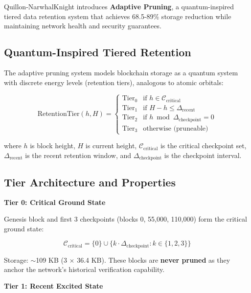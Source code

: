 \documentclass[11pt,a4paper]{article}
\begin{document}
Quillon-NarwhalKnight introduces \textbf{Adaptive Pruning}, a quantum-inspired tiered data retention system that achieves 68.5-89\% storage reduction while maintaining network health and security guarantees.

\subsection{Quantum-Inspired Tiered Retention}

The adaptive pruning system models blockchain storage as a quantum system with discrete energy levels (retention tiers), analogous to atomic orbitals:

\begin{equation}
\text{RetentionTier}(h, H) = \begin{cases}
\text{Tier}_0 & \text{if } h \in \mathcal{C}_{\text{critical}} \\
\text{Tier}_1 & \text{if } H - h \leq \Delta_{\text{recent}} \\
\text{Tier}_2 & \text{if } h \bmod \Delta_{\text{checkpoint}} = 0 \\
\text{Tier}_3 & \text{otherwise (pruneable)}
\end{cases}
\end{equation}

where $h$ is block height, $H$ is current height, $\mathcal{C}_{\text{critical}}$ is the critical checkpoint set, $\Delta_{\text{recent}}$ is the recent retention window, and $\Delta_{\text{checkpoint}}$ is the checkpoint interval.

\subsection{Tier Architecture and Properties}

\textbf{Tier 0: Critical Ground State}

Genesis block and first 3 checkpoints (blocks 0, 55,000, 110,000) form the critical ground state:

\begin{equation}
\mathcal{C}_{\text{critical}} = \{0\} \cup \{k \cdot \Delta_{\text{checkpoint}} : k \in \{1, 2, 3\}\}
\end{equation}

Storage: $\sim$109 KB (3 $\times$ 36.4 KB). These blocks are \textbf{never pruned} as they anchor the network's historical verification capability.

\textbf{Tier 1: Recent Excited State}
\end{document}
